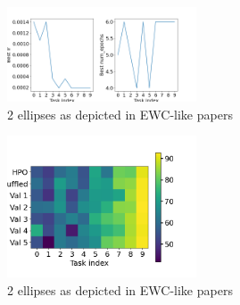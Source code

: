 \documentclass[twocolumn]{article}
\begin{document}
\begin{figure}
    \centering
    \includegraphics[width=0.5\textwidth]{images/best_params_greedy_HPO_GroHess_from_output_pMNIST_via_torch_standard_2024-07-16_20-41-35.png}
    \caption{2 ellipses as depicted in EWC-like papers}
    \label{fig:best_params}
\end{figure}

\begin{figure}
    \centering
    \includegraphics[width=0.5\textwidth]{images/val_accs_matrix_greedy_HPO_GroHess_from_output_pMNIST_via_torch_standard_2024-07-16_20-54-00.png}
    \caption{2 ellipses as depicted in EWC-like papers}
    \label{fig:best_params}
\end{figure}
\end{document}

